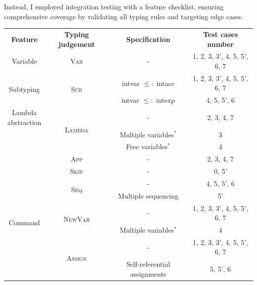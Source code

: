\documentclass[12pt,twoside,a4paper]{report}
\theoremstyle{definition}
\theoremstyle{definition}
\theoremstyle{definition}
\theoremstyle{definition}
\begin{document}
    Instead, I employed integration testing with a feature checklist, ensuring comprehensive coverage by validating all typing rules and targeting edge cases.
    \begin{table}[H]
        \centering
        \begin{tabular}{| c | c | c | c |}
            \hline
            \textbf{Feature}  & \textbf{Typing judgement} & \textbf{Specification} & \textbf{Test cases number} \\
            \hhline{|=|=|=|=|}
            Variable & \textsc{Var} & - & 1, 2, 3, 3', 4, 5, 5', 6, 7 \\ \cline{3-4}
            \hline
            \multirow{2}{*}{Subtyping} 
                & \multirow{2}{*}{\textsc{Sub}} 
                    & \textsf{intvar} $\leq:$ \textsf{intacc} & 1, 2, 3, 3', 4, 5, 5', 6, 7  \\ \cline{3-4}
                &   & \textsf{intvar} $\leq:$ \textsf{intexp} & 4, 5, 5', 6 \\
            \hline
            \multirowcell{4}{Lambda\\abstraction} 
                & \multirow{3}{*}{\textsc{Lambda}} 
                    & - & 2, 3, 4, 7 \\ \cline{3-4}
                &   & Multiple variables\hyperlink{note1}{$^{\ast}$} & 3  \\ \cline{3-4}
                &   & Free variables\hyperlink{note1}{$^{\ast}$} & 4 \\ \cline{2-4}
                & \textsc{App} & - & 2, 3, 4, 7  \\
            \hline
            \multirow{7}{*}{Command} 
                & \textsc{Skip} & - & 0, 5' \\ \cline{2-4}
                & \multirow{2}{*}{\textsc{Seq}} 
                    & - & 4, 5, 5', 6 \\ \cline{3-4}
                &   & Multiple sequencing & 5' \\ \cline{2-4}
                & \multirow{2}{*}{\textsc{NewVar}} 
                    & - & 1, 2, 3, 3', 4, 5, 5', 6, 7 \\ \cline{3-4}
                &   & Multiple variables\hyperlink{note1}{$^{\ast}$} & 4 \\ \cline{2-4}
                & \multirow{2}{*}{\textsc{Assign}} 
                    & -  & 1, 2, 3, 3', 4, 5, 5', 6, 7  \\ \cline{3-4}
                &   & Self-referential assignments & 5, 5', 6 \\
            \hline

\end{tabular}
\end{table}
\end{document}

